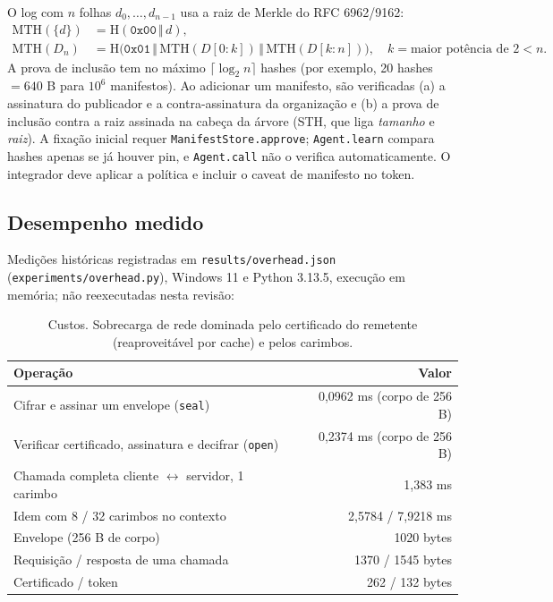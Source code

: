 \documentclass[11pt,a4paper]{article}
\theoremstyle{plain}
\theoremstyle{definition}
\theoremstyle{remark}
\newcommand{\Hash}{\mathrm{H}}
\newcommand{\cat}{\,\Vert\,}
\newcommand{\cod}[1]{\texttt{#1}}
\begin{document}
O log com $n$ folhas $d_0,\dots,d_{n-1}$ usa a raiz de Merkle do RFC 6962/9162:
\begin{align}
\mathrm{MTH}(\{d\}) &= \Hash(\texttt{0x00}\cat d),\\
\mathrm{MTH}(D_n) &= \Hash\big(\texttt{0x01}\cat\mathrm{MTH}(D[0{:}k])\cat\mathrm{MTH}(D[k{:}n])\big),\quad k=\text{maior potência de 2}<n.
\end{align}
A prova de inclusão tem no máximo $\lceil\log_2 n\rceil$ hashes (por exemplo, 20 hashes $=640$ B para $10^6$ manifestos). Ao adicionar um manifesto, são verificadas (a) a assinatura do publicador e a contra-assinatura da organização e (b) a prova de inclusão contra a raiz assinada na cabeça da árvore (STH, que liga \emph{tamanho} e \emph{raiz}). A fixação inicial requer \cod{ManifestStore.approve}; \cod{Agent.learn} compara hashes apenas se já houver pin, e \cod{Agent.call} não o verifica automaticamente. O integrador deve aplicar a política e incluir o caveat de manifesto no token.

\subsection{Desempenho medido}

Medições históricas registradas em \cod{results/overhead.json} (\cod{experiments/overhead.py}), Windows 11 e Python 3.13.5, execução em memória; não reexecutadas nesta revisão:

\begin{table}[h!]
\centering\small
\begin{tabular}{lr}
\toprule
\rowcolor{corCaixa}\textbf{Operação} & \textbf{Valor} \\
\midrule
Cifrar e assinar um envelope (\cod{seal}) & 0,0962 ms (corpo de 256 B) \\
Verificar certificado, assinatura e decifrar (\cod{open}) & 0,2374 ms (corpo de 256 B) \\
Chamada completa cliente $\leftrightarrow$ servidor, 1 carimbo & 1,383 ms \\
Idem com 8 / 32 carimbos no contexto & 2,5784 / 7,9218 ms \\
Envelope (256 B de corpo) & 1020 bytes \\
Requisição / resposta de uma chamada & 1370 / 1545 bytes \\
Certificado / token & 262 / 132 bytes \\
\bottomrule
\end{tabular}
\caption{Custos. Sobrecarga de rede dominada pelo certificado do remetente (reaproveitável por cache) e pelos carimbos.}
\end{table}
\end{document}
